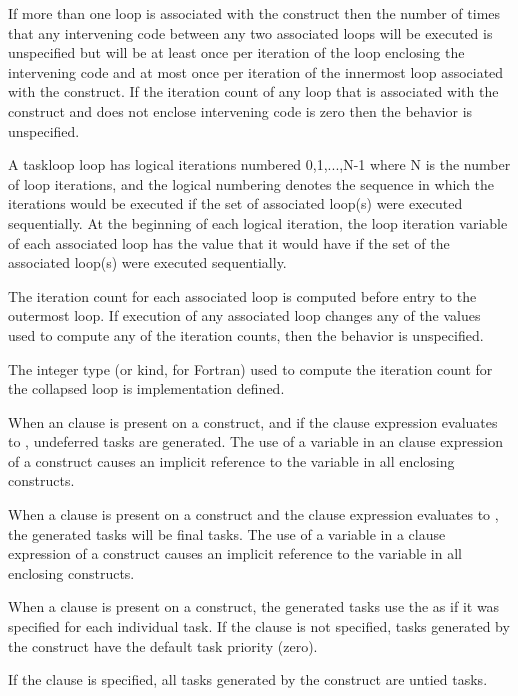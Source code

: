 If more than one loop is associated with the  construct
then the number of times that any intervening code between any two
associated loops will be executed is unspecified but will be at least
once per iteration of the loop enclosing the intervening code and at
most once per iteration of the innermost loop associated with the
construct.  If the iteration count of any loop that is associated with the
 construct and does not enclose intervening code is zero
then the behavior is unspecified.


A taskloop loop has logical iterations numbered 0,1,...,N-1 where N is
the number of loop iterations, and the logical numbering denotes the
sequence in which the iterations would be executed if the set of
associated loop(s) were executed sequentially.  At the beginning of
each logical iteration, the loop iteration variable of each associated
loop has the value that it would have if the set of the associated
loop(s) were executed sequentially.

The iteration count for each associated loop is computed before entry to the outermost loop. If execution of any associated loop changes any of the values used to compute any of the iteration counts, then the behavior is unspecified.

The integer type (or kind, for Fortran) used to compute the iteration count for the collapsed loop is implementation defined.

When an  clause is present on a  construct, and if the  clause expression evaluates to , undeferred tasks are generated. The use of a variable in an  clause expression of a  construct causes an implicit reference to the variable in all enclosing constructs.

When a  clause is present on a  construct and the  clause expression evaluates to , the generated tasks will be final tasks. The use of a variable in a  clause expression of a  construct causes an implicit reference to the variable in all enclosing constructs.

When a  clause is present on a  construct,
the generated tasks use the  as if it was
specified for each individual task.
If the  clause is not specified, tasks generated by
the  construct have the default task priority (zero).

If the  clause is specified, all tasks generated by the  construct are untied tasks.

